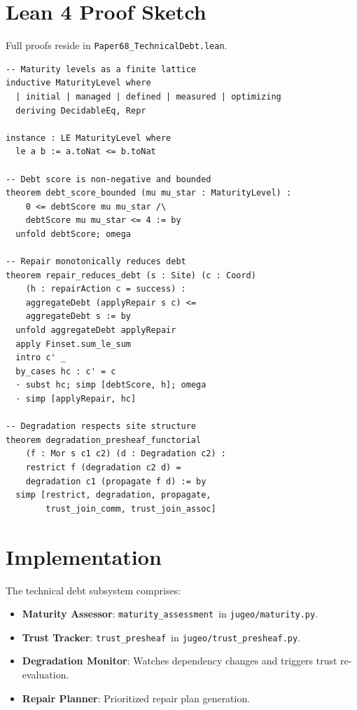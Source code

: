 \documentclass[11pt]{article}
\newcommand{\MaturityAssessment}{\texttt{maturity\_assessment}}
\newcommand{\TrustPresheaf}{\texttt{trust\_presheaf}}
\begin{document}
\section{Lean 4 Proof Sketch}\label{sec:lean-proof}

Full proofs reside in \texttt{Paper68\_TechnicalDebt.lean}.

\begin{lstlisting}[style=jugeo-output]
-- Maturity levels as a finite lattice
inductive MaturityLevel where
  | initial | managed | defined | measured | optimizing
  deriving DecidableEq, Repr

instance : LE MaturityLevel where
  le a b := a.toNat <= b.toNat

-- Debt score is non-negative and bounded
theorem debt_score_bounded (mu mu_star : MaturityLevel) :
    0 <= debtScore mu mu_star /\
    debtScore mu mu_star <= 4 := by
  unfold debtScore; omega

-- Repair monotonically reduces debt
theorem repair_reduces_debt (s : Site) (c : Coord)
    (h : repairAction c = success) :
    aggregateDebt (applyRepair s c) <=
    aggregateDebt s := by
  unfold aggregateDebt applyRepair
  apply Finset.sum_le_sum
  intro c' _
  by_cases hc : c' = c
  · subst hc; simp [debtScore, h]; omega
  · simp [applyRepair, hc]

-- Degradation respects site structure
theorem degradation_presheaf_functorial
    (f : Mor s c1 c2) (d : Degradation c2) :
    restrict f (degradation c2 d) =
    degradation c1 (propagate f d) := by
  simp [restrict, degradation, propagate,
        trust_join_comm, trust_join_assoc]
\end{lstlisting}

\section{Implementation}\label{sec:implementation}

The technical debt subsystem comprises:
\begin{itemize}[noitemsep]
  \item \textbf{Maturity Assessor}: \MaturityAssessment\ in
        \texttt{jugeo/maturity.py}.
  \item \textbf{Trust Tracker}: \TrustPresheaf\ in
        \texttt{jugeo/trust\_presheaf.py}.
  \item \textbf{Degradation Monitor}: Watches dependency changes and
        triggers trust re-evaluation.
  \item \textbf{Repair Planner}: Prioritized repair plan generation.
\end{itemize}
\end{document}
